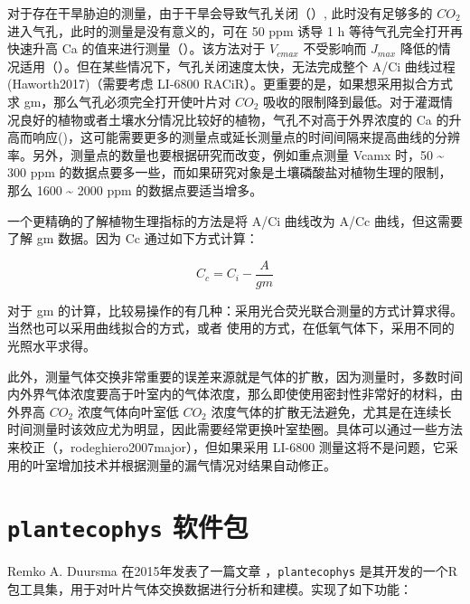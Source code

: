 \documentclass[
]{krantz}
\begin{document}
对于存在干旱胁迫的测量，由于干旱会导致气孔关闭（\citet{lauteri2014}）, 此时没有足够多的 \(CO_2\) 进入气孔，此时的测量是没有意义的，可在 50 ppm 诱导 1 h 等待气孔完全打开再快速升高 Ca 的值来进行测量（\citet{centritto2003}）。该方法对于 \(V_{cmax}\) 不受影响而 \(J_{max}\) 降低的情况适用（\citet{Aganchich2009}）。但在某些情况下，气孔关闭速度太快，无法完成整个 A/Ci 曲线过程 (Haworth2017)（需要考虑 LI-6800 RACiR）。更重要的是，如果想采用拟合方式求 gm，那么气孔必须完全打开使叶片对 \(CO_2\) 吸收的限制降到最低。对于灌溉情况良好的植物或者土壤水分情况比较好的植物，气孔不对高于外界浓度的 Ca 的升高而响应(\citet{haworth2015coordination})，这可能需要更多的测量点或延长测量点的时间间隔来提高曲线的分辨率。另外，测量点的数量也要根据研究而改变，例如重点测量 Vcamx 时，50 \textasciitilde{} 300 ppm 的数据点要多一些，而如果研究对象是土壤磷酸盐对植物生理的限制，那么 1600 \textasciitilde{} 2000 ppm 的数据点要适当增多。

一个更精确的了解植物生理指标的方法是将 A/Ci 曲线改为 A/Cc 曲线，但这需要了解 gm 数据。因为 Cc 通过如下方式计算：

\begin{equation}
C_c = C_i - \frac{A}{gm}
\label{eq:notecc}
\end{equation}

对于 gm 的计算，比较易操作的有几种：采用光合荧光联合测量的方式计算求得。当然也可以采用曲线拟合的方式，或者 \citet{yin2009using} 使用的方式，在低氧气体下，采用不同的光照水平求得。

此外，测量气体交换非常重要的误差来源就是气体的扩散，因为测量时，多数时间内外界气体浓度要高于叶室内的气体浓度，那么即使使用密封性非常好的材料，由外界高 \(CO_2\) 浓度气体向叶室低 \(CO_2\) 浓度气体的扩散无法避免，尤其是在连续长时间测量时该效应尤为明显，因此需要经常更换叶室垫圈。具体可以通过一些方法来校正（\citet{Flexas2007leak}，rodeghiero2007major），但如果采用 LI-6800 测量这将不是问题，它采用的叶室增加技术并根据测量的漏气情况对结果自动修正。

\cleardoublepage

\hypertarget{plantecophys}{%
\section{\texorpdfstring{\texttt{plantecophys} 软件包}{plantecophys 软件包}}\label{plantecophys}}

Remko A. Duursma 在2015年发表了一篇文章 \citet{Duursma2015Plantecophys}，\texttt{plantecophys} 是其开发的一个R包工具集，用于对叶片气体交换数据进行分析和建模。实现了如下功能：
\end{document}

